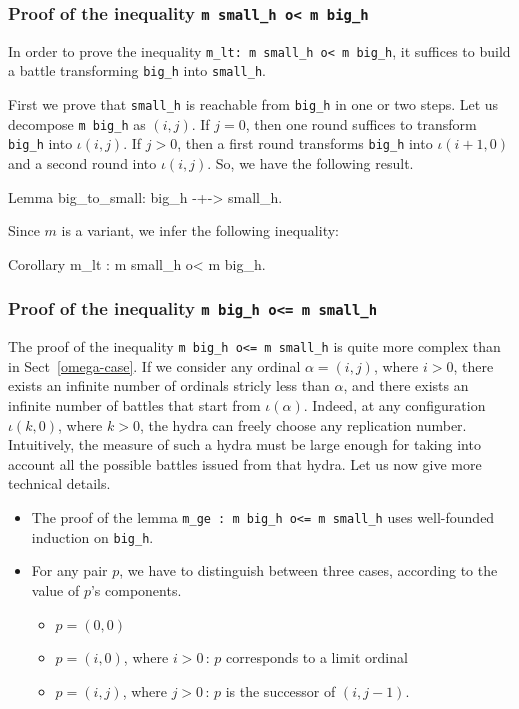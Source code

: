 \subsubsection{Proof of the inequality \texttt{m small\_h o< m big\_h}}

In order to prove the inequality  \texttt{m\_lt: m small\_h o< m big\_h}, it suffices to
build a battle transforming \texttt{big\_h} into \texttt{small\_h}.

First we prove that \texttt{small\_h} is reachable from \texttt{big\_h} in one or two steps. Let us decompose \texttt{m big\_h} as $(i,j)$.
If $j=0$, then one round suffices to transform \texttt{big\_h} into $\iota(i,j)$.
If $j>0$, then a first round transforms \texttt{big\_h} into $\iota(i+1,0)$ and a second round into $\iota(i,j)$. So, we have the following result.

\begin{Coqsrc}
  Lemma big_to_small: big_h -+-> small_h.
\end{Coqsrc}

Since $m$ is a variant, we infer the following inequality:

\begin{Coqsrc}
   Corollary m_lt : m small_h o< m big_h.
\end{Coqsrc}


\subsubsection{Proof of the inequality \texttt{m big\_h o<= m small\_h} }


The proof of the inequality \texttt{m big\_h o<= m small\_h} is quite more complex than in Sect~\ref{omega-case}.  If we consider any ordinal $\alpha=(i,j)$, where $i>0$, there exists an infinite number of
ordinals stricly less than $\alpha$, and there exists an infinite number of battles that start from
$\iota(\alpha)$. Indeed, at any configuration $\iota(k,0)$, where $k>0$, the hydra can freely choose any replication number. Intuitively, the measure of such a hydra must be large enough for taking into account
all the possible battles issued from that hydra.
Let us now give more technical details.

\begin{itemize}
\item The proof of the lemma \texttt{m\_ge : m big\_h  o<= m small\_h} uses well-founded induction on \texttt{big\_h}.

\item For any pair $p$, we have to distinguish between three cases, according to the value of $p$'s components.
  \begin{itemize}
  \item $p=(0,0)$
  \item $p=(i,0)$, where $i>0$\,: $p$ corresponds to a limit ordinal
  \item $p=(i,j)$, where $j>0$\,: $p$ is the successor of $(i,j-1)$.
  \end{itemize}
\end{itemize}


